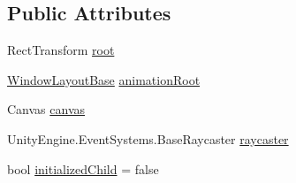 \subsection*{Public Attributes}
\begin{DoxyCompactItemize}
\item 
Rect\+Transform \hyperlink{class_unity_engine_1_1_u_i_1_1_windows_1_1_types_1_1_tip_window_type_a106008af107c25202fa70c10c6c00ec3}{root}
\item 
\hyperlink{class_unity_engine_1_1_u_i_1_1_windows_1_1_window_layout_base}{Window\+Layout\+Base} \hyperlink{class_unity_engine_1_1_u_i_1_1_windows_1_1_types_1_1_tip_window_type_ac07899f0cac0ece2db38481101e90e5c}{animation\+Root}
\item 
Canvas \hyperlink{class_unity_engine_1_1_u_i_1_1_windows_1_1_types_1_1_tip_window_type_ac447c3fb3dda60b4fd297ce002833038}{canvas}
\item 
Unity\+Engine.\+Event\+Systems.\+Base\+Raycaster \hyperlink{class_unity_engine_1_1_u_i_1_1_windows_1_1_types_1_1_tip_window_type_a67720f96a24ec43b3e278d74fe8500a2}{raycaster}
\item 
bool \hyperlink{class_unity_engine_1_1_u_i_1_1_windows_1_1_types_1_1_tip_window_type_aeeb9086268e6713d12b32c4a30e8d72c}{initialized\+Child} = false
\end{DoxyCompactItemize}
